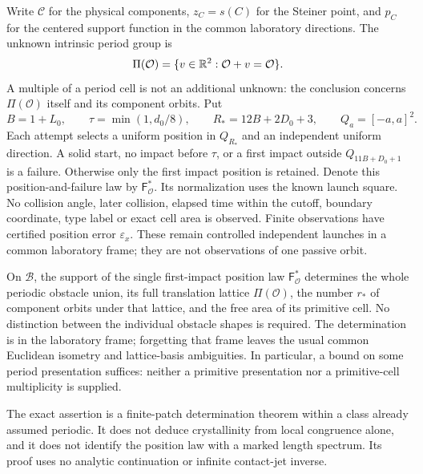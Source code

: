 Write $\mathcal C$ for the physical components, $z_C=s(C)$ for the
Steiner point, and $p_C$ for the centered support function in the common
laboratory directions. The unknown intrinsic period group is
\[
       \Pi(\mathcal O)=\{v\in\mathbb R^2:\mathcal O+v=\mathcal O\}.
\]
A multiple of a period cell is not an additional unknown: the conclusion
concerns $\Pi(\mathcal O)$ itself and its component orbits. Put
\begin{equation}\label{eq:repeatwindow}
 B=1+L_0,\qquad \tau=\min(1,d_0/8),\qquad
 R_*=12B+2D_0+3,\qquad Q_a=[-a,a]^2.
\end{equation}
Each attempt selects a uniform position in $Q_{R_*}$ and an independent
uniform direction. A solid start, no impact before $\tau$, or a first
impact outside $Q_{11B+D_0+1}$ is a failure. Otherwise only the first
impact position is retained. Denote this position-and-failure law by
$\mathsf F^*_{\mathcal O}$. Its normalization uses the known launch
square. No collision angle, later collision, elapsed time within the
cutoff, boundary coordinate, type label or exact cell area is observed.
Finite observations have certified position error $\varepsilon_x$.
These remain controlled independent launches in a common laboratory
frame; they are not observations of one passive orbit.

\begin{theorem}
\label{thm:repeat-exact}
On $\mathcal B$, the support of the single first-impact position law
$\mathsf F^*_{\mathcal O}$ determines the whole periodic obstacle union,
its full translation lattice $\Pi(\mathcal O)$, the number $r_*$ of
component orbits under that lattice, and the free area of its primitive
cell. No distinction between the individual obstacle shapes is required.
The determination is in the laboratory frame; forgetting that frame
leaves the usual common Euclidean isometry and lattice-basis ambiguities.
In particular, a bound on some period presentation suffices: neither a
primitive presentation nor a primitive-cell multiplicity is supplied.
\end{theorem}

The exact assertion is a finite-patch determination theorem within a
class already assumed periodic. It does not deduce crystallinity from
local congruence alone, and it does not identify the position law with a
marked length spectrum. Its proof uses no analytic continuation or
infinite contact-jet inverse.

